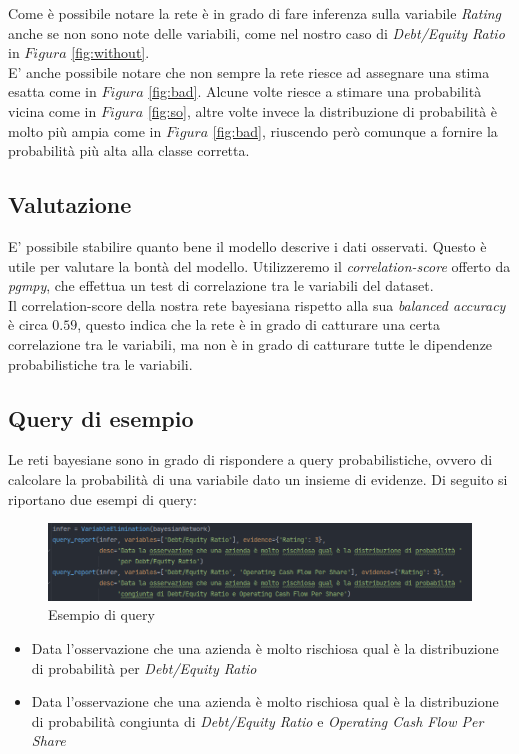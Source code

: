 \noindent Come è possibile notare la rete è in grado di fare inferenza sulla variabile \textit{Rating} anche se non sono note delle variabili, come nel nostro caso di \textit{Debt/Equity Ratio} in $Figura$ \ref{fig:without}.
\\ E' anche possibile notare che non sempre la rete riesce ad assegnare una stima esatta come in $Figura$ \ref{fig:bad}. Alcune volte riesce a stimare una probabilità vicina come in $Figura$ \ref{fig:so}, altre volte invece la distribuzione di probabilità è molto più ampia come in $Figura$ \ref{fig:bad}, riuscendo però comunque a fornire la probabilità più alta alla classe corretta.

\subsection{Valutazione}

\noindent E' possibile stabilire quanto bene il modello descrive i dati osservati. Questo è utile per valutare la bontà del modello. Utilizzeremo il \textit{correlation-score} offerto da \textit{pgmpy}, che effettua un test di correlazione tra le variabili del dataset.\\ Il correlation-score della nostra rete bayesiana rispetto alla sua \textit{balanced accuracy} è circa $0.59$, questo indica che la rete è in grado di catturare una certa correlazione tra le variabili, ma non è in grado di catturare tutte le dipendenze probabilistiche tra le variabili.

\subsection{Query di esempio}
\noindent Le reti bayesiane sono in grado di rispondere a query probabilistiche, ovvero di calcolare la probabilità di una variabile dato un insieme di evidenze. Di seguito si riportano due esempi di query:

\begin{figure}[H]
    \centering
    \includegraphics[scale=0.5]{img/ex_query.png}
    \caption{Esempio di query}
\end{figure}

\begin{itemize}[label=-]
    \item Data l'osservazione che una azienda è molto rischiosa qual è la distribuzione di probabilità per \textit{Debt/Equity Ratio}
    \item Data l'osservazione che una azienda è molto rischiosa qual è la distribuzione di probabilità congiunta di \textit{Debt/Equity Ratio} e \textit{Operating Cash Flow Per Share}
\end{itemize}

